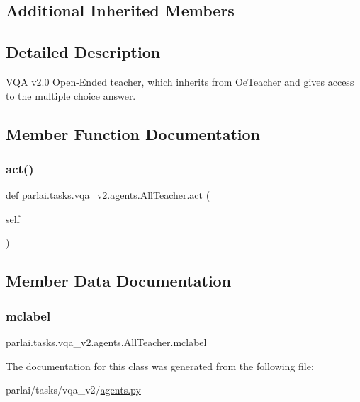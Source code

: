 \subsection*{Additional Inherited Members}


\subsection{Detailed Description}
\begin{DoxyVerb}VQA v2.0 Open-Ended teacher, which inherits from OeTeacher and gives access to the
multiple choice answer.
\end{DoxyVerb}
 

\subsection{Member Function Documentation}
\mbox{\label{classparlai_1_1tasks_1_1vqa__v2_1_1agents_1_1AllTeacher_a4a97c6641e40361ef66c5c6084eaebea}} 
\subsubsection{\texorpdfstring{act()}{act()}}
{\footnotesize\ttfamily def parlai.\+tasks.\+vqa\+\_\+v2.\+agents.\+All\+Teacher.\+act (\begin{DoxyParamCaption}\item[{}]{self }\end{DoxyParamCaption})}



\subsection{Member Data Documentation}
\mbox{\label{classparlai_1_1tasks_1_1vqa__v2_1_1agents_1_1AllTeacher_a4da023a0162581d4364ccaafafb001d6}} 
\subsubsection{\texorpdfstring{mclabel}{mclabel}}
{\footnotesize\ttfamily parlai.\+tasks.\+vqa\+\_\+v2.\+agents.\+All\+Teacher.\+mclabel}



The documentation for this class was generated from the following file\+:\begin{DoxyCompactItemize}
\item 
parlai/tasks/vqa\+\_\+v2/\hyperlink{parlai_2tasks_2vqa__v2_2agents_8py}{agents.\+py}\end{DoxyCompactItemize}
